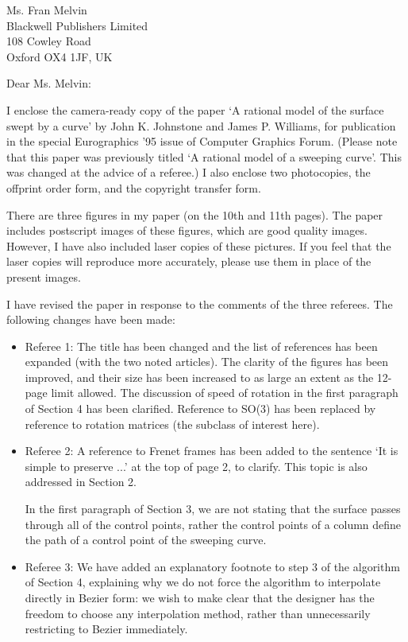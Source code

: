 \address{\ \ }
\signature{Prof. John K. Johnstone}

\begin{letter}
{Ms. Fran Melvin\\
Blackwell Publishers Limited\\
108 Cowley Road\\
Oxford OX4 1JF, UK
}

\opening{Dear Ms. Melvin:}

I enclose the camera-ready copy of the paper 
`A rational model of the surface swept by a curve'
by John K. Johnstone and James P. Williams,
for publication in the special Eurographics '95 issue of
Computer Graphics Forum.
(Please note that this paper was previously titled 
`A rational model of a sweeping curve'.  This was changed
at the advice of a referee.)
I also enclose two photocopies, the offprint order form,
and the copyright transfer form.

There are three figures in my paper (on the 10th and 11th pages).  
The paper includes postscript images of these figures, which
are good quality images.
However, I have also included laser copies of these pictures.
If you feel that the laser copies will reproduce more accurately,
please use them in place of the present images.

I have revised the paper in response to the comments of the
three referees.
The following changes have been made:
\begin{itemize}
\item
	Referee 1:
	The title has been changed and the list of references
	has been expanded (with the two noted articles).
	The clarity of the figures has been improved,
	and their size has been increased to as large an extent
	as the 12-page limit allowed.
	The discussion of speed of rotation in the
	first paragraph of Section 4 has been clarified.
	Reference to SO(3) has been replaced by reference
	to rotation matrices (the subclass of interest here).
\item
	Referee 2:
	A reference to Frenet frames has been added to the
	sentence `It is simple to preserve ...' at the top
	of page 2, to clarify.  
	This topic is also addressed in Section 2.

	In the first paragraph of Section 3, we are not
	stating that the surface passes through all of the control
	points, rather the control points of a column define the
	path of a control point of the sweeping curve.
\item
	Referee 3:
	We have added an explanatory footnote to step 3 of the
	algorithm of Section 4, explaining why we do not force
	the algorithm to interpolate directly in Bezier form:
	we wish to make clear that the designer has the freedom
	to choose any interpolation method, rather than
	unnecessarily restricting to Bezier immediately.


\end{itemize}
\end{letter}
